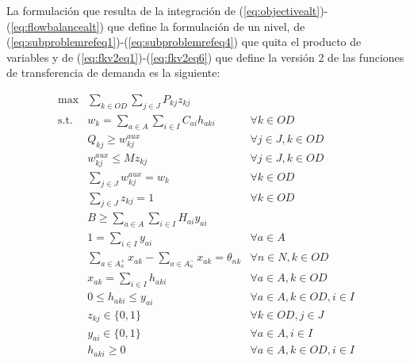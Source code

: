 La formulación que resulta de la integración de (\ref{eq:objectivealt})-(\ref{eq:flowbalancealt}) que define la formulación de un nivel, de (\ref{eq:subproblemrefeq1})-(\ref{eq:subproblemrefeq4}) que quita el producto de variables y de (\ref{eq:fkv2eq1})-(\ref{eq:fkv2eq6}) que define la versión 2 de las funciones de transferencia de demanda es la siguiente:

\begin{align}
  \max          & \sum_{k \in OD} \sum_{j \in J} P_{kj} z_{kj}                          & \label{eq:objectivefinalalt} \\
  \text{s.t.}\; & w_k = \sum_{a \in A} \sum_{i \in I} C_{ai}h_{aki}                     & \forall k \in OD \label{eq:shortestpathaltfinal} \\
                & Q_{kj} \geq w^{aux}_{kj}                                              & \forall j \in J, k \in OD \label{eq:breakpointsalt} \\
                & w^{aux}_{kj} \leq M z_{kj}                                            & \forall j \in J, k \in OD \\
                & \sum_{j \in J} w^{aux}_{kj} = w_k                                     & \forall k \in OD \\
                & \sum_{j \in J} z_{kj} = 1                                             & \forall k \in OD \label{eq:singularbreakpointalt} \\
                & B \geq \sum_{a \in A} \sum_{i \in I} H_{ai}y_{ai}                     & \label{eq:respectbudgetaltfinal} \\
                & 1 = \sum_{i \in I} y_{ai}                                             & \forall a \in A \label{eq:alwaysoneyaltfinal} \\
                & \sum_{a \in A_n^+} x_{ak} - \sum_{a \in A_n^-} x_{ak} = \theta_{nk}   & \forall n \in N, k \in OD \label{eq:flowbalancealtfinal} \\
                & x_{ak} = \sum_{i \in I} h_{aki}                                       & \forall a \in A, k \in OD \label{eq:flowactivationalt} \\
                & 0 \leq h_{aki} \leq y_{ai}                                            & \forall a \in A, k \in OD, i \in I \label{eq:respectinfraalt} \\
                & z_{kj} \in \{0,1\}                                                    & \forall k \in OD, j \in J \nonumber \\
                & y_{ai} \in \{0,1\}                                                    & \forall a \in A, i \in I \nonumber \\
                & h_{aki} \geq 0                                                        & \forall a \in A, k \in OD, i \in I \nonumber
\end{align}

